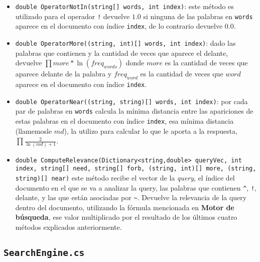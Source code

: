 \documentclass[a4paper, 12pt]{article}
\begin{document}
\begin{itemize}
	\item {\tt double OperatorNotIn(string[] words, int index)}: este método es utilizado para el operador {\tt !} devuelve $1.0$ si ninguna de las palabras en {\tt words}
	      aparece en el documento con índice {\tt index}, de lo contrario devuelve $0.0$.
	\item {\tt double OperatorMore((string, int)[] words, int index)}: dado las palabras que contienen {\tt *} y la cantidad de veces que aparece el {\tt *} delante, devuelve $\prod more * \ln(freq_{words})$ donde $more$ es la cantidad de veces que {\tt *} aparece delante de la palabra y $freq_{word}$ es la cantidad de veces que $word$ aparece en el documento con índice {\tt index}.
	\item {\tt double OperatorNear((string, string)[] words, int index)}: por cada par de palabras en {\tt words} calcula la mínima distancia entre las apariciones de estas palabras en el documento con índice {\tt index}, esa mínima distancia (llamemosle $md$), la utilizo para calcular lo que le aporta a la respuesta, $\prod \frac{2}{\ln(md) + 1}$.
	\item {\tt double ComputeRelevance(Dictionary<string,double> queryVec, int index, string[] need, string[] forb, (string, int)[] more, (string, string)[] near)} este método recibe el vector de la {\it query}, el índice del documento en el que se va a analizar la query, las palabras que contienen {\tt \^{}}, {\tt !}, {\tt *} delante, y las que están asociadas por {\tt \~{}}. Devuelve la relevancia de la query dentro del documento, utilizando la fórmula mencionada en {\bf Motor de búsqueda}, ese valor multiplicado por el resultado de los últimos cuatro métodos explicados anteriormente.
\end{itemize}

\subsection*{\tt SearchEngine.cs}
\end{document}
